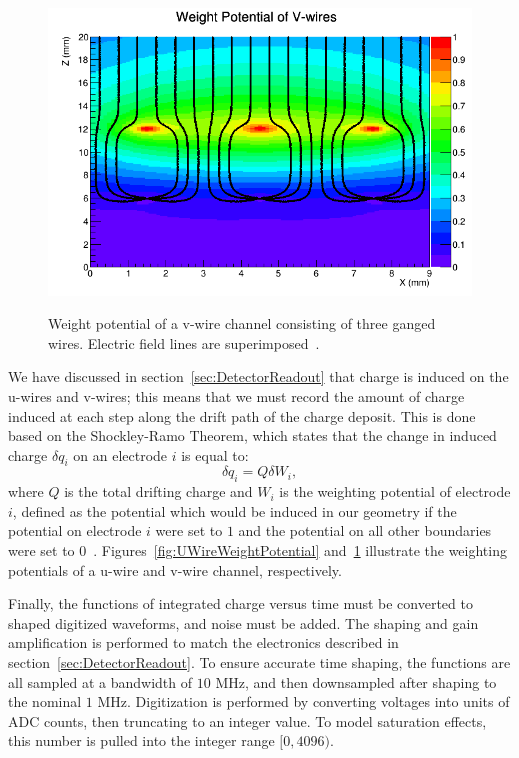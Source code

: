 \begin{figure}
\begin{center}
\includegraphics[keepaspectratio=true,width=\textwidth]{WeightPotContoursV_WithE.png}
\end{center}
\renewcommand{\baselinestretch}{1}
\small\normalsize
\begin{quote}
\caption{Weight potential of a v-wire channel consisting of three ganged wires.  Electric field lines are superimposed~\cite{MCDocumentRun2a}.}
\label{fig:VWireWeightPotential}
\end{quote}
\end{figure}
\renewcommand{\baselinestretch}{2}
\small\normalsize

We have discussed in section~\ref{sec:DetectorReadout} that charge is induced on the u-wires and v-wires; this means that we must record the amount of charge induced at each step along the drift path of the charge deposit.  This is done based on the Shockley-Ramo Theorem, which states that the change in induced charge $\delta q_i$ on an electrode $i$ is equal to:
\begin{equation}
\delta q_i = Q \delta W_i,
\end{equation}
where $Q$ is the total drifting charge and $W_i$ is the weighting potential of electrode $i$, defined as the potential which would be induced in our geometry if the potential on electrode $i$ were set to $1$ and the potential on all other boundaries were set to $0$~\cite{ShockleyPaper,1686997}.  Figures~\ref{fig:UWireWeightPotential} and~\ref{fig:VWireWeightPotential} illustrate the weighting potentials of a u-wire and v-wire channel, respectively.

Finally, the functions of integrated charge versus time must be converted to shaped digitized waveforms, and noise must be added.  The shaping and gain amplification is performed to match the electronics described in section~\ref{sec:DetectorReadout}.  To ensure accurate time shaping, the functions are all sampled at a bandwidth of $10$ MHz, and then downsampled after shaping to the nominal $1$ MHz.  Digitization is performed by converting voltages into units of ADC counts, then truncating to an integer value.  To model saturation effects, this number is pulled into the integer range $[0, 4096)$.

